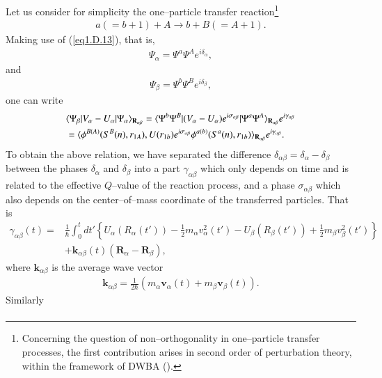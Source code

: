\begin{subappendices}
 Let us  consider for simplicity the one--particle transfer reaction\footnote{Concerning the question of non--orthogonality in one--particle transfer processes, the first contribution arises in second order of perturbation theory, within the framework of DWBA (\cite{Thompson:09}).}
  \begin{align}\label{eq1.D.28}
a(=b+1)+A\rightarrow b+B(=A+1).
  \end{align}
  Making use of (\ref{eq1.D.13}), that is,
   \begin{align}\label{eq1.D.31}
\Psi_\alpha=\Psi^a\Psi^Ae^{i\delta_\alpha},
   \end{align}
 and
    \begin{align}\label{eq1.D.32}
 \Psi_\beta=\Psi^b\Psi^Be^{i\delta_\beta},
    \end{align}
 one can write
    \begin{align}\label{eq1.D.33}
\nonumber &\langle {\Psi_\beta|V_\alpha-U_\alpha|\Psi_\alpha} \rangle_{\mathbf R_{\alpha\beta}}=\langle {\Psi^b\Psi^B|(V_\alpha-U_\alpha)e^{i\sigma_{\alpha\beta}}|\Psi^a\Psi^A} \rangle_{\mathbf R_{\alpha\beta}}e^{i\gamma_{\alpha\beta}}\\
&=\langle {\phi^{B(A)}(S^B(n),r_{1A}),U(r_{1b})e^{i\sigma_{\alpha\beta}}\phi^{a(b)}(S^a(n),r_{1b})} \rangle_{\mathbf R_{\alpha\beta}}e^{i\gamma_{\alpha\beta}}.
    \end{align}
 To obtain the above relation, we have separated the difference $\delta_{\alpha\beta}=\delta_\alpha-\delta_\beta$ between the phases $\delta_\alpha$ and $\delta_\beta$ into a part $\gamma_{\alpha\beta}$ which only depends on time and is related to the effective $Q$--value of the reaction process, and a phase $\sigma_{\alpha\beta}$ which also depends on the center--of--mass coordinate of the transferred particles. That is
\begin{align}\label{eq1.D.34}
\nonumber \gamma_{\alpha\beta}(t)=&\frac{1}{\hbar}\int_0^t d t'\left\{U_\alpha( R_\alpha(t'))-\frac{1}{2}m_\alpha v_\alpha^2(t')-U_\beta(R_\beta (t'))+\frac{1}{2}m_\beta v_\beta^2(t')\right\}\\
&+\mathbf k_{\alpha\beta}(t)(\mathbf R_\alpha-\mathbf R_\beta),
\end{align}
 where $\mathbf k_{\alpha\beta}$ is the average wave vector 
     \begin{align}\label{eq1.D.35}
\mathbf k_{\alpha\beta}=\frac{1}{2\hbar}\left(m_\alpha\mathbf v_\alpha(t)+m_\beta\mathbf v_\beta(t)\right).
     \end{align}
 Similarly
\begin{align}\label{eq1.D.36}

\end{align}
\end{subappendices}
